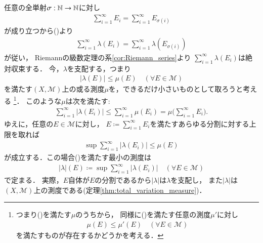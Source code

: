 	任意の全単射$\sigma:\mathbb{N} \rightarrow \mathbb{N}$に対し
	\begin{align}
		\sum_{i=1}^{\infty}E_i = \sum_{i=1}^{\infty}E_{\sigma(i)}
	\end{align}
	が成り立つから()より
	\begin{align}
		\sum_{i=1}^{\infty} \lambda(E_i) = \sum_{i=1}^{\infty} \lambda(E_{\sigma(i)})
	\end{align}
	が従い，
	Riemannの級数定理の系\ref{cor:Riemann_series}より
	$\sum_{i=1}^{\infty} \lambda(E_i)$は絶対収束する．
	今，$\lambda$を支配する，つまり
	\begin{align}
		|\lambda(E)| \leq \mu(E) \quad (\forall E \in \mathcal{M})
		\label{radon_nikodym_1}
	\end{align}
	を満たす$(X,\mathcal{M})$上の或る測度$\mu$を，できるだけ小さいものとして取ろうと考える
	\footnote{
		つまり()を満たす$\mu$のうちから，
		同様に()を満たす任意の測度$\mu'$に対し
		\begin{align}
			\mu(E) \leq \mu'(E) \quad (\forall E \in \mathcal{M})
		\end{align}
		を満たすものが存在するかどうかを考える．
	}．
	このような$\mu$は次を満たす:
	\begin{align}
		\sum_{i=1}^{\infty} |\lambda(E_i)| \leq \sum_{i=1}^{\infty} \mu(E_i) 
		= \mu \biggl( \sum_{i=1}^{\infty} E_i \biggr).
	\end{align}
	ゆえに，任意の$E \in \mathcal{M}$に対し，
	$E \coloneqq \sum_{i=1}^{\infty} E_i$を満たすあらゆる分割に対する上限を取れば
	\begin{align}
		\sup{}{\sum_{i=1}^{\infty} |\lambda(E_i)|} 
		\leq \mu(E)
		\label{radon_nikodym_2}
	\end{align}
	が成立する．この場合()を満たす最小の測度は
	\begin{align}
		|\lambda|(E) \coloneqq \sup{}{\sum_{i=1}^{\infty} |\lambda(E_i)|} \quad (\forall E \in \mathcal{M})
		\label{radon_nikodym_3}
	\end{align}
	で定まる．
	実際，$E$自体が$E$の分割であるから$|\lambda|$は$\lambda$を支配し，
	また$|\lambda|$は$(X,\mathcal{M})$上の測度である(定理\ref{thm:total_variation_measure})．
	
